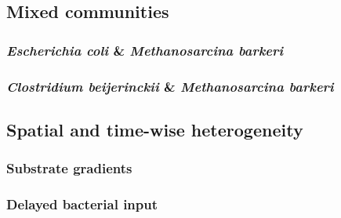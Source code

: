 \subsection{Mixed communities}
\subsubsection{\textit{Escherichia coli} \& \textit{Methanosarcina barkeri}}
\subsubsection{\textit{Clostridium beijerinckii} \& \textit{Methanosarcina barkeri}}

\subsection{Spatial and time-wise heterogeneity}
\subsubsection{Substrate gradients}
\subsubsection{Delayed bacterial input}
